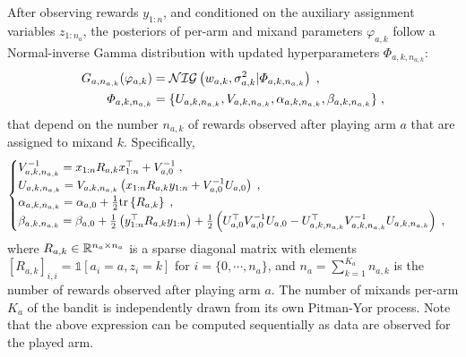 After observing rewards $y_{1:n}$, and conditioned on the auxiliary assignment variables $z_{1:n_a}$, the posteriors of per-arm and mixand parameters $\varphi_{a,k}$ follow a Normal-inverse Gamma distribution with updated hyperparameters $\varPhi_{a,k,n_{a,k}}$:
\begin{align}
G_{a,n_{a,k}}(\varphi_{a,k}) &=\mathcal{NIG}\left( w_{a,k}, \sigma_{a,k}^2 |\varPhi_{a,k,n_{a,k}}\right) \;, \\
\varPhi_{a,k,n_{a,k}}& =\{U_{a,k,n_{a,k}}, V_{a,k,n_{a,k}},\alpha_{a,k,n_{a,k}}, \beta_{a,k,n_{a,k}} \} \;, \nonumber
\end{align}
that depend on the number $n_{a,k}$ of rewards observed after playing arm $a$ that are assigned to mixand $k$. Specifically,
\begin{equation}
\begin{cases}
V_{a,k,n_{a,k}}^{-1} = x_{1:n} R_{a,k} x_{1:n}^\top + V_{a,0}^{-1} \;,\\
U_{a,k,n_{a,k}}= V_{a,k,n_{a,k}} \left( x_{1:n} R_{a,k} y_{1:n} + V_{a,0}^{-1} U_{a,0}\right) \;, \\
\alpha_{a,k,n_{a,k}} = \alpha_{a,0} + \frac{1}{2} \mathrm{tr}\left\{ R_{a,k} \right\} \;, \\
\beta_{a,k,n_{a,k}} = \beta_{a,0} + \frac{1}{2}\left(y_{1:n}^\top R_{a,k}y_{1:n} \right) + \frac{1}{2}\left( U_{a,0}^\top V_{a,0}^{-1} U_{a,0} - U_{a,k,n_{a,k}}^\top V_{a,k,n_{a,k}}^{-1} U_{a,k,n_{a,k}} \right) \; ,
\end{cases}
\label{eq:posterior_hyperparameters}
\end{equation}
where $R_{a,k}\in{\mathbb R}^{n_a\times n_a}$ is a sparse diagonal matrix with elements $\left[R_{a,k}\right]_{i,i}=\mathds{1}[a_i=a,z_i=k]$ for $i=\{0,\cdots, n_a\}$, and $n_{a}=\sum_{k=1}^{K_a} n_{a,k}$ is the number of rewards observed after playing arm $a$. The number of mixands per-arm $K_a$ of the bandit is independently drawn from its own Pitman-Yor process. Note that the above expression can be computed sequentially as data are observed for the played arm.

